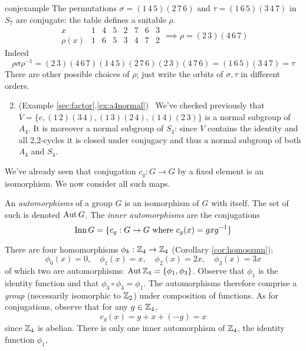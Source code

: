 \begin{examples}{}{conjexample}
\exstart The permutations $\sigma=(1\,4\,5)(2\,7\,6)$ and $\tau=(1\,6\,5)(3\,4\,7)$ in $S_7$ are conjugate: the table defines a suitable $\rho$.
	\[\begin{array}{l|ccccccc}
      x&1&4&5&2&7&6&3\\\hline
      \rho(x)&1&6&5&3&4&7&2
      \end{array} \implies \rho=(2\,3)(4\,6\,7)\]
	Indeed
	\[
	\rho\sigma\rho^{-1}= (2\,3)(4\,6\,7)(1\,4\,5)(2\,7\,6)(2\,3)(4\,7\,6) =(1\,6\,5)(3\,4\,7) =\tau
	\]
	There are other possible choices of $\rho$; just write the orbits of $\sigma,\tau$ in different orders.
\begin{enumerate}\setcounter{enumi}{1}
	\item (Example \ref*{sec:factor}.\ref{ex:a4normal}) \ We've checked previously that $V=\{e,(1\,2)(3\,4),(1\,3)(2\,4),(1\,4)(2\,3)\}$ is a normal subgroup of $A_4$. It is moreover a normal subgroup of $S_4$: since $V$ contains the identity and all 2,2-cycles it is closed under conjugacy and thus a normal subgroup of both $A_4$ and $S_4$.
% 	
\end{enumerate}
\end{examples}




We've already seen that conjugation $c_g:G\to G$ by a fixed element is an isomorphism. We now consider all such maps.

\begin{defn}{}{}
An \emph{automorphisms} of a group $G$ is an isomorphism of $G$ with itself. The set of such is denoted $\operatorname{Aut} G$. The \emph{inner automorphisms} are the conjugations
\[\operatorname{Inn} G=\{c_g:G\to G\text{ where }c_g(x)=gxg^{-1}\}\]
\end{defn}

\begin{example}{}{}
There are four homomorphisms $\phi_k:\mathbb{Z}_4\to\mathbb{Z}_4$ (Corollary \ref{cor:homoszmn});
	\[\phi_0(x)=0,\quad \phi_1(x)=x,\quad \phi_2(x)=2x,\quad \phi_3(x)=3x\]
	of which two are automorphisms: $\operatorname{Aut}\mathbb{Z}_4=\{\phi_1,\phi_3\}$.
	Observe that $\phi_1$ is the identity function and that $\phi_3\circ\phi_3=\phi_1$. The automorphisms therefore comprise a \emph{group} (necessarily isomorphic to $\mathbb{Z}_2$) under composition of functions.\smallbreak
		As for conjugations, observe that for any $g\in\mathbb{Z}_4$,
		\[c_g(x)=g+x+(-g)=x\]
		since $\mathbb{Z}_4$ is abelian. There is only one inner automorphism of $\mathbb{Z}_4$, the identity function $\phi_1$.
\end{example}

